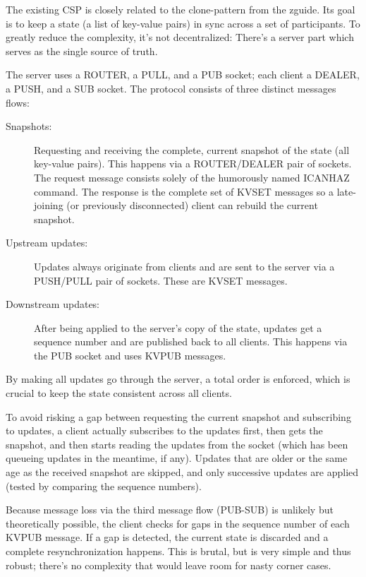 The existing \acrfull{CSP} is closely related to the \gls{clone-pattern} from the \gls{zguide}. Its
goal is to keep a state (a list of key-value pairs) in sync across a set of
participants. To greatly reduce the complexity, it's not decentralized: There's
a server part which serves as the single source of truth.

The server uses a ROUTER, a PULL, and a PUB socket; each client a DEALER, a
PUSH, and a SUB socket. The protocol consists of three distinct messages flows:

\begin{description}
	\item [Snapshots:]
		Requesting and receiving the complete, current snapshot of the
		state (all key-value pairs). This happens via a
		ROUTER/DEALER pair of sockets. The request message consists solely of
		the humorously named ICANHAZ command. The response is the
		complete set of KVSET messages so a late-joining (or previously
		disconnected) client can rebuild the current snapshot.

	\item [Upstream updates:]
		Updates always originate from clients and are sent to the
		server via a PUSH/PULL pair of sockets. These are KVSET messages.

	\item [Downstream updates:]
		After being applied to the server's copy of the state,
		updates get a sequence number and are published back to all
		clients. This happens via the PUB socket and
		uses KVPUB messages.
\end{description}

By making all updates go through the server, a total order is enforced,
which is crucial to keep the state consistent across all clients.

To avoid risking a gap between requesting the current snapshot and subscribing
to updates, a client actually subscribes to the updates first, then gets the
snapshot, and then starts reading the updates from the socket (which has been
queueing updates in the meantime, if any). Updates that are older or the same
age as the received snapshot are skipped, and only successive updates are
applied (tested by comparing the sequence numbers).

Because message loss via the third message flow (PUB-SUB) is unlikely but
theoretically possible, the client checks for gaps in the sequence number of
each KVPUB message. If a gap is detected, the current state is discarded and a
complete resynchronization happens. This is brutal, but is very simple and thus
robust; there's no complexity that would leave room for nasty corner cases.

